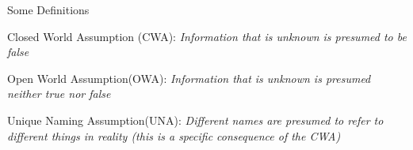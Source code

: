 \begin{frame}{Some Definitions}


    \begin{definition}
        Closed World Assumption (CWA): \textit{Information that is unknown is presumed to be false} 
    \end{definition}

    \begin{definition}
        Open World Assumption(OWA): \textit{Information that is unknown is presumed neither true nor false}
    \end{definition}

    \begin{definition}
        Unique Naming Assumption(UNA): \textit{Different names are presumed to refer to different things in reality (this is a specific consequence of the CWA)}
    \end{definition}
        
    
\end{frame}
